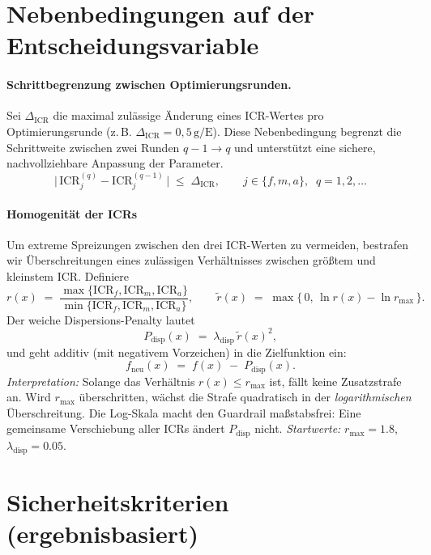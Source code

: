 \documentclass[ngerman,a4paper,12pt,pdftex]{article}
\newcommand{\ICR}{\mathrm{ICR}}
\newcommand{\ICRf}{\mathrm{ICR}_f}
\newcommand{\ICRm}{\mathrm{ICR}_m}
\newcommand{\ICRa}{\mathrm{ICR}_a}
\newcommand{\DICR}{\Delta_{\mathrm{ICR}}}
\newcommand{\rmax}{r_{\max}}
\newcommand{\lambdadisp}{\lambda_{\mathrm{disp}}}
\begin{document}
\section{Nebenbedingungen auf der Entscheidungsvariable}


\paragraph{Schrittbegrenzung zwischen Optimierungsrunden.} Sei \(\DICR\) die maximal zulässige Änderung eines \(\ICR\)-Wertes pro Optimierungsrunde (z.\,B. \(\DICR=0{,}5\,\mathrm{g}/\mathrm{E}\)). Diese Nebenbedingung begrenzt die Schrittweite zwischen zwei Runden \(q-1 \to q\) und unterstützt eine sichere, nachvollziehbare Anpassung der Parameter.
\[
\bigl|\,\ICR_j^{(q)} - \ICR_j^{(q-1)}\,\bigr| \;\le\; \DICR,
\qquad j \in \{f,m,a\},\;\; q=1,2,\dots
\]

\medskip

\paragraph{Homogenität der ICRs}
Um extreme Spreizungen zwischen den drei ICR-Werten zu vermeiden, bestrafen wir
Überschreitungen eines zulässigen Verhältnisses zwischen größtem und kleinstem ICR.
Definiere
\[
r(x)\;=\;\frac{\max\{\ICRf,\ICRm,\ICRa\}}{\min\{\ICRf,\ICRm,\ICRa\}},
\qquad
\tilde r(x)\;=\;\max\{\,0,\,\ln r(x)-\ln \rmax\,\}.
\]
Der weiche Dispersions-Penalty lautet
\[
P_{\mathrm{disp}}(x)\;=\;\lambdadisp\,\tilde r(x)^{2},
\]
und geht additiv (mit negativem Vorzeichen) in die Zielfunktion ein:
\[
f_{\text{neu}}(x)\;=\;f(x)\;-\;P_{\mathrm{disp}}(x).
\]
\noindent
\textit{Interpretation:} Solange das Verhältnis \(r(x)\le\rmax\) ist, fällt keine Zusatzstrafe an.
Wird \(\rmax\) überschritten, wächst die Strafe quadratisch in der \emph{logarithmischen} Überschreitung.
Die Log-Skala macht den Guardrail maßstabsfrei: Eine gemeinsame Verschiebung aller ICRs
ändert \(P_{\mathrm{disp}}\) nicht. \textit{Startwerte:} \(\rmax=1.8\), \(\lambdadisp=0.05\).

\section{Sicherheitskriterien (ergebnisbasiert)}
\end{document}

